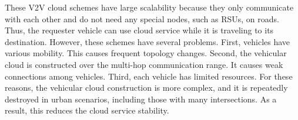 \documentclass[electronics,aricle,accept,pdftex,moreauthors]{Definitions/mdpi}
\begin{document}

These V2V cloud schemes have large scalability because they only communicate with each other and do not need any special nodes, such as RSUs, on roads. Thus, the requester vehicle can use cloud service while it is traveling to its destination. However, these schemes have several problems. First, vehicles have various mobility. This causes frequent topology changes. Second, the vehicular cloud is constructed over the multi-hop communication range. It causes weak connections among vehicles. Third, each vehicle has limited resources. For these reasons, the vehicular cloud construction is more complex, and it is repeatedly destroyed in urban scenarios, including those with many intersections. As a result, this reduces the cloud service stability.
\end{document}
